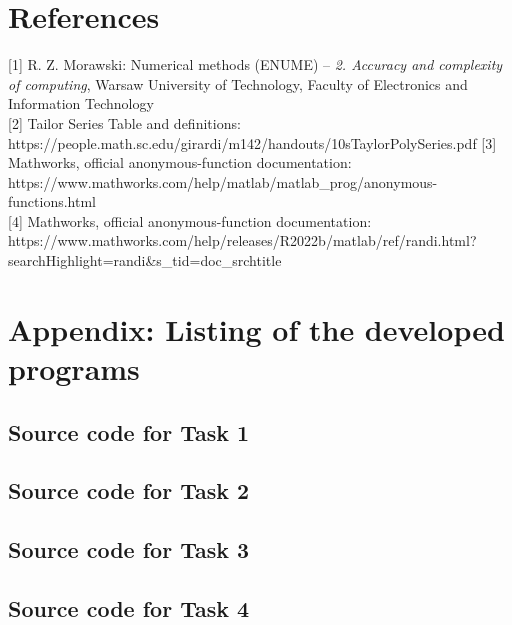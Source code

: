 \documentclass[11pt]{article}
\begin{document}
\newpage


\newpage


\newpage


\newpage


\newpage
\section{References}
{[1]} R. Z. Morawski: Numerical methods (ENUME) – \emph{2. Accuracy and complexity of computing}, Warsaw University of Technology, Faculty of Electronics and Information Technology \\
{[2]} Tailor Series Table and definitions: \\https://people.math.sc.edu/girardi/m142/handouts/10sTaylorPolySeries.pdf
{[3]} Mathworks, official anonymous-function documentation: \\ https://www.mathworks.com/help/matlab/matlab_prog/anonymous-functions.html \\
{[4]} Mathworks, official anonymous-function documentation: \\ https://www.mathworks.com/help/releases/R2022b/matlab/ref/randi.html?searchHighlight=randi&s_tid=doc_srchtitle \\

\newpage
\section{Appendix: Listing of the developed programs}
\subsection{Source code for Task 1}

\newpage
\subsection{Source code for Task 2}

\newpage
\subsection{Source code for Task 3}

\newpage
\subsection{Source code for Task 4}

\end{document}
